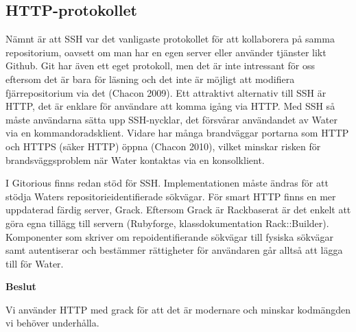 \subsection{HTTP-protokollet}
Nämnt är att SSH var det vanligaste protokollet för att kollaborera på samma repositorium, oavsett om man har en egen server eller använder tjänster likt Github. Git har även ett eget protokoll, men det är inte intressant för oss eftersom det är bara för läsning och det inte är möjligt att modifiera fjärrepositorium via det (Chacon 2009). Ett attraktivt alternativ till SSH är HTTP, det är enklare för användare att komma igång via HTTP.  Med SSH så måste användarna sätta upp SSH-nycklar, det försvårar användandet av Water via en kommandoradsklient.  Vidare har många brandväggar portarna som HTTP och HTTPS (säker HTTP) öppna (Chacon 2010), vilket minskar risken för brandsväggsproblem när Water kontaktas via en konsolklient.

I Gitorious finns redan stöd för SSH. Implementationen måste ändras för att stödja Waters repositorieidentifierade sökvägar. För smart HTTP finns en mer uppdaterad färdig server, Grack.  Eftersom Grack är Rackbaserat är det enkelt att göra egna tillägg till servern (Rubyforge, klassdokumentation Rack::Builder). Komponenter som skriver om repoidentifierande sökvägar till fysiska sökvägar samt autentiserar och bestämmer rättigheter för användaren går alltså att lägga till för Water.

\begin{flushright}
  
  \textbf{Beslut}
  
  Vi använder HTTP med grack för att det är modernare och minskar kodmängden vi behöver underhålla.
  
\end{flushright}
